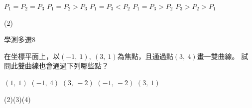 \begin{QUESTIONS}
\begin{QUESTION}
\begin{QBODY}
			\begin{QOPS}
				\QOP $P_1=P_2=P_3$
				\QOP $P_1=P_2>P_3$
				\QOP $P_1=P_3<P_2$
				\QOP $P_1=P_3>P_2$
				\QOP $P_3>P_2>P_1$
			\end{QOPS}
        \end{QBODY}
        \begin{QFROMS}
        \end{QFROMS}
        \begin{QTAGS}\end{QTAGS}
        \begin{QANS}
			(2)
        \end{QANS}
        \begin{QSOLLIST}
        \end{QSOLLIST}
        \begin{QEMPTYSPACE}
        \end{QEMPTYSPACE}
    \end{QUESTION}
\end{QUESTIONS}\begin{QUESTIONS}
    \begin{QUESTION}
        \begin{ExamInfo}{89}{學測}{多選}{8}
        \end{ExamInfo}
        \begin{ExamAnsRateInfo}{}{}{}{}
        \end{ExamAnsRateInfo}
        \begin{QBODY}
			在坐標平面上，以$(-1,\ 1),\ (3,\ 1)$為焦點，且通過點$(3,\ 4)$畫一雙曲線。
試問此雙曲線也會通過下列哪些點？
			\begin{QOPS}
				\QOP	$(1,\ 1)$
				\QOP	$(-1,\ 4)$
				\QOP	$(3,\ -2)$
				\QOP	$(-1,\ -2)$
				\QOP	$(3,\ 1)$
			\end{QOPS}
        \end{QBODY}
        \begin{QFROMS}
        \end{QFROMS}
        \begin{QTAGS}\end{QTAGS}
        \begin{QANS}
			(2)(3)(4)
        \end{QANS}
        \begin{QSOLLIST}
        \end{QSOLLIST}
        \begin{QEMPTYSPACE}
        \end{QEMPTYSPACE}
    \end{QUESTION}
    \begin{QUESTION}

\end{QUESTION}
\end{QUESTIONS}
